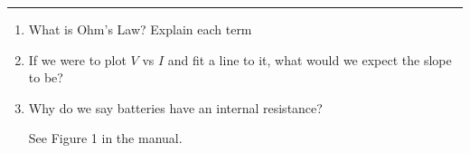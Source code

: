 \documentclass[11pt]{article}
\begin{document}
\Large

\medskip\hrule\bigskip\bigskip
{}
\begin{enumerate}

\item What is Ohm's Law? Explain each term
  \vspace*{0.27\textheight}
\item If we were to plot $V$ vs $I$ and fit a line to it, what would we expect the slope to be?
  \vspace*{0.27\textheight}
\item Why do we say batteries have an internal resistance?

  See Figure 1 in the manual.
  
\end{enumerate}
\end{document}
